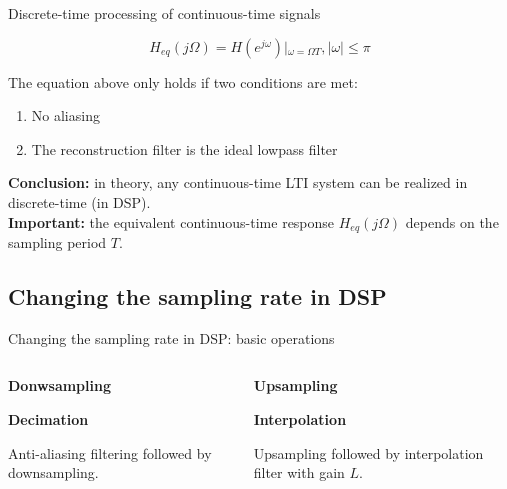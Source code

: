\documentclass[10pt]{beamer}
\begin{document}
%
\begin{frame}{Discrete-time processing of continuous-time signals}
\vspace{-0.5cm}
\begin{center}
	\def\Heff{1}
	\resizebox{\linewidth}{!}{}
\end{center}

\begin{equation*}
H_{eq}(j\Omega) = H(e^{j\omega})|_{\omega = \Omega T}, |\omega| \leq \pi
\end{equation*}

The equation above only holds if two conditions are met:
\begin{enumerate}
	\item No aliasing
	\item The reconstruction filter is the ideal lowpass filter
\end{enumerate}
\textbf{Conclusion:} in theory, any continuous-time LTI system can be realized in discrete-time (in DSP).\\
\textbf{Important:} the equivalent continuous-time response $H_{eq}(j\Omega)$ depends on the sampling period $T$.
\end{frame}

\subsection{Changing the sampling rate in DSP}
\begin{frame}{Changing the sampling rate in DSP: basic operations}
\begin{columns}[t]
	\begin{column}{0.5\textwidth}
		\textbf{Donwsampling}
		\begin{center}
			\resizebox{!}{0.16\textheight}{}
		\end{center}
		\textbf{Decimation}
		\begin{center}
			\resizebox{!}{0.19\textheight}{}
		\end{center}
		Anti-aliasing filtering followed by downsampling.
	\end{column}
	\begin{column}{0.5\textwidth}
	\textbf{Upsampling}
	\vspace{-0.7cm}
	\begin{center}
		\resizebox{1.2\textwidth}{!}{}
	\end{center}
	
	\textbf{Interpolation}
	\vspace{0.35cm}
	\begin{center}
	\resizebox{!}{0.14\textheight}{}
	\end{center}
	Upsampling followed by interpolation filter with gain $L$.
	\end{column}
\end{columns}
\end{frame}
\end{document}

